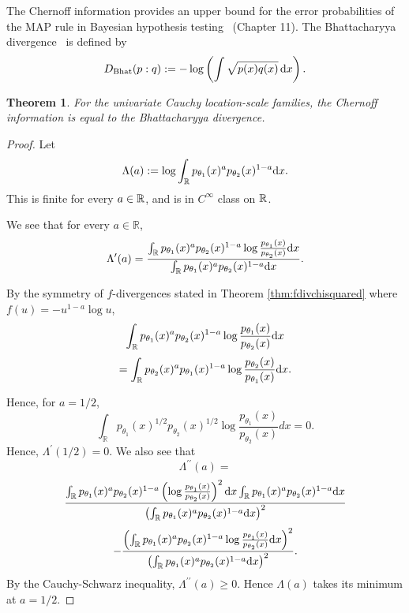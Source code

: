 \documentclass[journal]{IEEEtran}
\newtheorem{theorem}{Theorem}
\begin{document}
The Chernoff information provides an upper bound for the error probabilities of the MAP rule in Bayesian hypothesis testing~\cite{CT-2012} (Chapter 11). 
The Bhattacharyya divergence~\cite{bhattacharyya1943measure} is defined by
\begin{equation}\label{eq:def-Bhat-div}
D_{\Bhat}(p:q) := -\log\left( \int \sqrt{p(x)q(x)} \, \dx \right). 
\end{equation}

\begin{theorem}
For the univariate Cauchy location-scale families, the Chernoff information is equal to the Bhattacharyya divergence. 
\end{theorem}


\begin{proof}
Let 
$$
\Lambda(a) := \log \int_{\mathbb R} p_{\theta_1} (x)^a p_{\theta_2} (x)^{1-a} \mathrm{d}x.
$$
This is finite for every $a\in{\mathbb{R}}$, and is in  $C^{\infty}$ class on ${\mathbb{R}}$. 

We see that for every $a \in \mathbb R$, 
$$
\Lambda^{\prime}(a)  = \frac{ \int_{\mathbb R}  p_{\theta_1} (x)^a p_{\theta_2} (x)^{1-a} \log \frac{p_{\theta_1}(x)}{p_{\theta_2}(x)} \mathrm{d}x}{\int_{\mathbb R}  p_{\theta_1} (x)^a p_{\theta_2}(x)^{1-a} \mathrm{d}x}.
$$

By the symmetry of $f$-divergences stated in Theorem \ref{thm:fdivchisquared} where $f(u) = -u^{1-a} \log u$, 
$$
\int_{\mathbb R}  p_{\theta_1} (x)^a p_{\theta_2} (x)^{1-a} \log \frac{p_{\theta_1}(x)}{p_{\theta_2}(x)} \mathrm{d}x $$
$$=
 \int_{\mathbb R}  p_{\theta_2} (x)^a p_{\theta_1} (x)^{1-a} \log \frac{p_{\theta_2}(x)}{p_{\theta_1}(x)} \mathrm{d}x. 
$$

Hence, for $a=1/2$, 
\begin{equation*}
\int_{\mathbb R}  p_{\theta_1} (x)^{1/2} p_{\theta_2} (x)^{1/2} \log \frac{p_{\theta_1}(x)}{p_{\theta_2}(x)} dx = 0. 
\end{equation*} 
Hence, 
$ \Lambda^{\prime}(1/2) = 0$. 
We also see that 
\[ \Lambda^{\prime\prime}(a) =\]
\[ \frac{\int_{\mathbb R}  p_{\theta_1} (x)^a p_{\theta_2} (x)^{1-a} \left(\log \frac{p_{\theta_1}(x)}{p_{\theta_2}(x)} \right)^2 \mathrm{d}x \int_{\mathbb R}  p_{\theta_1} (x)^a p_{\theta_2}(x)^{1-a} \mathrm{d}x}{\left(\int_{\mathbb R}  p_{\theta_1} (x)^a p_{\theta_2}(x)^{1-a} \mathrm{d}x\right)^2} \]
\[ - \frac{\left( \int_{\mathbb R}  p_{\theta_1} (x)^a p_{\theta_2} (x)^{1-a} \log \frac{p_{\theta_1}(x)}{p_{\theta_2}(x)} \mathrm{d}x \right)^2}{\left(\int_{\mathbb R}  p_{\theta_1} (x)^a p_{\theta_2}(x)^{1-a} \mathrm{d}x\right)^2}.\]
By the Cauchy-Schwarz inequality, $ \Lambda^{\prime\prime}(a) \ge 0$. 
Hence $\Lambda(a)$ takes its minimum at $a=1/2$. 
\end{proof}
\end{document}
